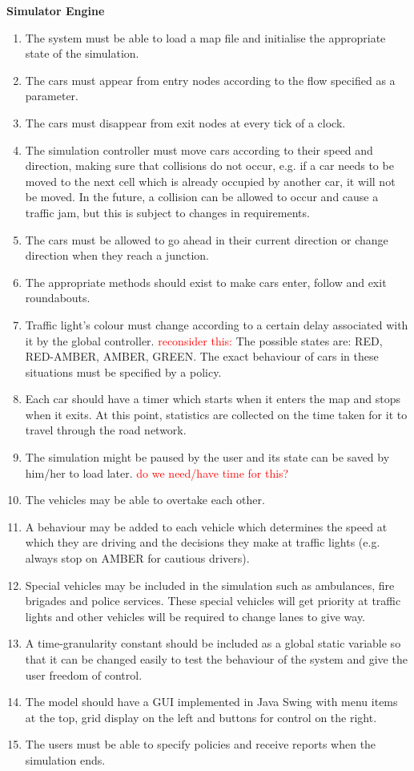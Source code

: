 \documentclass{article}
\begin{document}
\noindent
{\bf Simulator Engine}
\begin{enumerate}
	
	\item  The system must be able to load a map file and initialise the appropriate state of the simulation.
	
	\item The cars must appear from entry nodes according to the flow specified as a parameter.
	\item The cars must disappear from exit nodes at every tick of a clock.
	\item The simulation controller must move cars according to their speed and direction, making sure that collisions do not occur, e.g. if a car needs to be moved to the next cell which is already occupied by another car, it will not be moved. In the future, a collision can be allowed to occur and cause a traffic jam, but this is subject to changes in requirements.
	\item The cars must be allowed to go ahead in their current direction or change direction when they reach a junction. 
	\item The appropriate methods should exist to make cars enter, follow and exit roundabouts.
	\item Traffic light's colour must change according to a certain delay associated with it by the global controller. \textcolor{red}{reconsider this:} The possible states are: RED, RED-AMBER, AMBER, GREEN. The exact behaviour of cars in these situations must be specified by a policy.
	\item Each car should have a timer which starts when it enters the map and stops when it exits. At this point, statistics are collected on the time taken for it to travel through the road network.
	\item  The simulation might be paused by the user and its state can be saved by him/her to load later. \textcolor{red}{do we need/have time for this?}
	\item The vehicles may be able to overtake each other. 
	\item  A behaviour may be added to each vehicle which determines the  speed at which they are driving and the decisions they make at traffic lights (e.g. always stop on AMBER for cautious drivers).
	\item Special vehicles may be included in the simulation such as ambulances, fire brigades and police services. These special vehicles will get priority at traffic lights and other vehicles will be required to change lanes to give way. 
	\item A time-granularity constant should be included as a global static variable so that it can be changed easily to test the behaviour of the system and give the user freedom of control. 
	\item The model should have a GUI implemented in Java Swing with menu items at the top, grid display on the left and buttons for control on the right. 
	\item The users must be able to specify policies and receive reports when the simulation ends.  
	
\end{enumerate}
\end{document}
